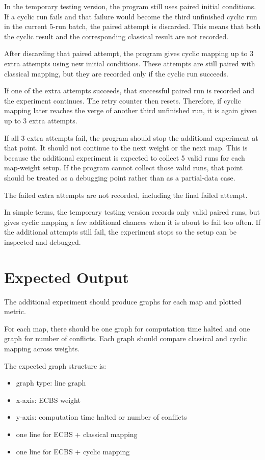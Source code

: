 \documentclass[11pt,a4paper]{article}
\begin{document}
In the temporary testing version, the program still uses paired initial conditions. If a cyclic run fails and that failure would become the third unfinished cyclic run in the current 5-run batch, the paired attempt is discarded. This means that both the cyclic result and the corresponding classical result are not recorded.

After discarding that paired attempt, the program gives cyclic mapping up to 3 extra attempts using new initial conditions. These attempts are still paired with classical mapping, but they are recorded only if the cyclic run succeeds.

If one of the extra attempts succeeds, that successful paired run is recorded and the experiment continues. The retry counter then resets. Therefore, if cyclic mapping later reaches the verge of another third unfinished run, it is again given up to 3 extra attempts.

If all 3 extra attempts fail, the program should stop the additional experiment at that point. It should not continue to the next weight or the next map. This is because the additional experiment is expected to collect 5 valid runs for each map-weight setup. If the program cannot collect those valid runs, that point should be treated as a debugging point rather than as a partial-data case.

The failed extra attempts are not recorded, including the final failed attempt.

In simple terms, the temporary testing version records only valid paired runs, but gives cyclic mapping a few additional chances when it is about to fail too often. If the additional attempts still fail, the experiment stops so the setup can be inspected and debugged.

\section*{Expected Output}

The additional experiment should produce graphs for each map and plotted metric.

For each map, there should be one graph for computation time halted and one graph for number of conflicts. Each graph should compare classical and cyclic mapping across weights.

The expected graph structure is:

\begin{itemize}[leftmargin=2em]
    \item graph type: line graph
    \item x-axis: ECBS weight
    \item y-axis: computation time halted or number of conflicts
    \item one line for ECBS + classical mapping
    \item one line for ECBS + cyclic mapping
\end{itemize}
\end{document}

